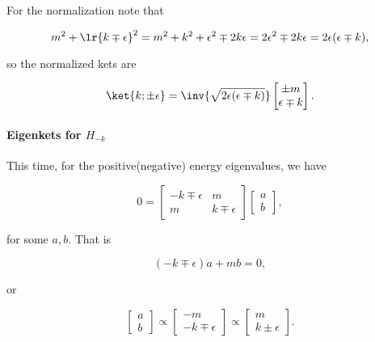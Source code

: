 For the normalization note that

\begin{dmath}\label{eqn:gradQuantumProblemSet4Problem3:200}
m^2 + \lr{ k \mp \epsilon }^2
=
m^2 + k^2 + \epsilon^2 \mp 2 k \epsilon
=
2 \epsilon^2 \mp 2 k \epsilon
=
2 \epsilon (\epsilon \mp k),
\end{dmath}

so the normalized kets are

\begin{dmath}\label{eqn:gradQuantumProblemSet4Problem3:220}
\ket{k; \pm\epsilon} =
\inv{\sqrt{2 \epsilon(\epsilon \mp k)}}
\begin{bmatrix}
\pm m \\
\epsilon \mp k
\end{bmatrix}.
\end{dmath}

\paragraph{Eigenkets for \( H_{-k} \)}

This time, for the positive(negative) energy eigenvalues, we have

\begin{dmath}\label{eqn:gradQuantumProblemSet4Problem3:141}
0
=
\begin{bmatrix}
-k \mp \epsilon & m \\
m & k \mp \epsilon
\end{bmatrix}
\begin{bmatrix}
a \\
b
\end{bmatrix},
\end{dmath}

for some \( a, b\).  That is

\begin{dmath}\label{eqn:gradQuantumProblemSet4Problem3:161}
(-k \mp \epsilon) a + m b = 0,
\end{dmath}

or

\begin{dmath}\label{eqn:gradQuantumProblemSet4Problem3:181}
\begin{bmatrix}
a \\
b
\end{bmatrix}
\propto
\begin{bmatrix}
- m \\
-k \mp \epsilon
\end{bmatrix}
\propto
\begin{bmatrix}
m \\
k \pm \epsilon
\end{bmatrix}.
\end{dmath}

